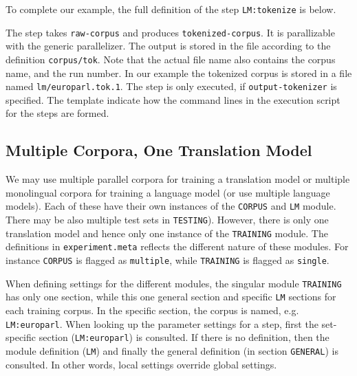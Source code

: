 \documentclass{pbml}
\begin{document}
To complete our example, the full definition of the step {\tt LM:tokenize} is below.

\vspace{2mm}
\colorbox{gray}{%
}
\vspace{2mm}

The step takes {\tt raw-corpus} and produces {\tt tokenized-corpus}. It is parallizable with the generic parallelizer. 
The output is stored in the file according to the definition {\tt corpus/tok}. Note that the actual file name also contains the corpus name, and the run number. In our example the tokenized corpus is stored in a file named  {\tt lm/europarl.tok.1}. 
The step is only executed, if {\tt output-tokenizer} is specified. The template indicate how the command lines in the execution script for the steps are formed.

\subsection{Multiple Corpora, One Translation Model}

We may use multiple parallel corpora for training a translation model or multiple monolingual corpora for training a language model (or use multiple language models). Each of these have their own instances of the {\tt CORPUS} and {\tt LM} module. There may be also multiple test sets in {\tt TESTING}). However, there is only one translation model and hence only one instance of the {\tt TRAINING} module. 
The definitions in {\tt experiment.meta} reflects the different nature of these modules. For instance {\tt CORPUS} is flagged as {\tt multiple}, while {\tt TRAINING} is flagged as {\tt single}.

When defining settings for the different modules, the singular module {\tt TRAIN\-ING} has only one section, while this one general section and specific {\tt LM} sections for each training corpus. In the specific section, the corpus is named, e.g. {\tt LM:europarl}.
When looking up the parameter settings for a step, first the set-specific section ({\tt LM:europarl}) is consulted. If there is no definition, then the module definition ({\tt LM}) and finally the general definition (in section {\tt GENERAL}) is consulted. In other words, local settings override global settings.
\end{document}
